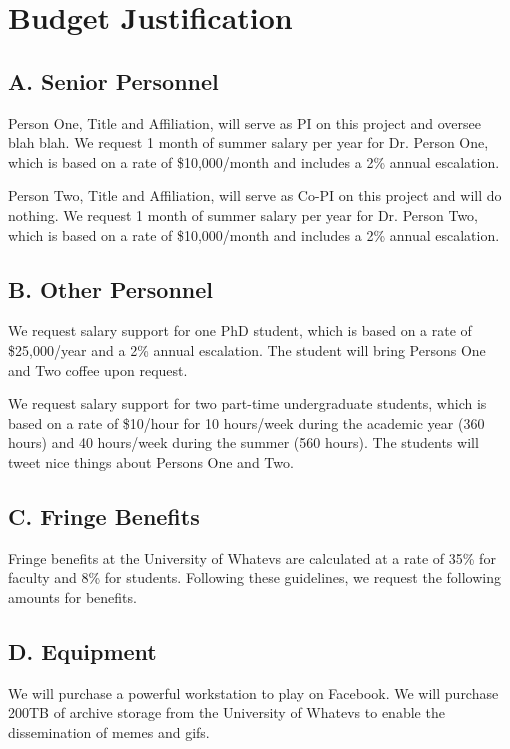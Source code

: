 \section*{Budget Justification}

\subsection*{A. Senior Personnel}

 Person One, Title and Affiliation, will serve as PI on this project and oversee blah blah. We request 1 month of summer salary per year for Dr. Person One, which is based on a rate of \$10,000/month and includes a 2\% annual escalation.

 Person Two, Title and Affiliation, will serve as Co-PI on this project and will do nothing. We request 1 month of summer salary per year for Dr. Person Two, which is based on a rate of \$10,000/month and includes a 2\% annual escalation.

\subsection*{B. Other Personnel}
 We request salary support for one PhD student, which is based on a rate of \$25,000/year and a 2\% annual escalation. The student will bring Persons One and Two coffee upon request.

 We request salary support for two part-time undergraduate students, which is based on a rate of \$10/hour for 10 hours/week during the academic year (360 hours) and 40 hours/week during the summer (560 hours). The students will tweet nice things about Persons One and Two.

\subsection*{C. Fringe Benefits}
Fringe benefits at the University of Whatevs are calculated at a rate of 35\% for faculty and 8\% for students. Following these guidelines, we request the following amounts for benefits.

\subsection*{D. Equipment}
We will purchase a powerful workstation to play on Facebook. We will purchase 200TB of archive storage from the University of Whatevs to enable the dissemination of memes and gifs.

